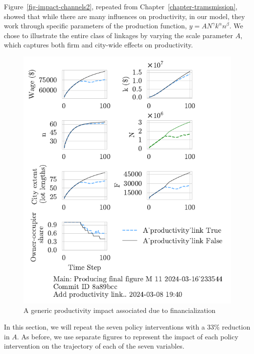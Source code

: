 Figure~\ref{fig-impact-channels2}, repeated from Chapter~\ref{chapter-tramsmission}, showed that while there are many influences on productivity, in our model, they work through specific parameters of the production function, $y=AN^\gamma k^\alpha n^\beta$. 
We chose to illustrate the entire class of linkages by varying the scale parameter $A$, which captures both firm and city-wide effects on productivity. 




\begin{figure}[h!tb] 
    \centering
    \includegraphics[scale=.75, trim={0 1.4cm .8cm 0},clip]{fig/generic-productivity-impact_233544.pdf} 
    \caption{A generic productivity impact associated due to financialization}
    \label{fig:generic-productivity-impact}
\end{figure}

In this section, we will repeat the seven policy interventions with a 33\% reduction in $A$.  As before, we use separate figures to represent the impact of each policy intervention on the trajectory of each of the seven variables. 



